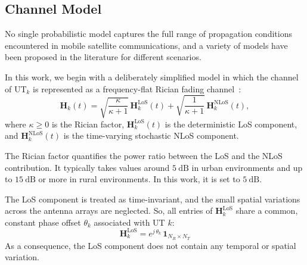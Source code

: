 \subsection*{Channel Model}

No single probabilistic model captures the full range of propagation conditions encountered in mobile satellite communications, and a variety of models have been proposed in the literature for different scenarios.

In this work, we begin with a deliberately simplified model in which the channel of \ac{UT}$_k$ is represented as a frequency-flat Rician fading channel~\cite{4_mimo_over_satellite_review, 7_coherence_time_non_terrestrial}:
\begin{equation}
\label{eq:rician_channel_model}
    \mathbf{H}_k(t) = \sqrt{\frac{\kappa}{\kappa+1}} \, \mathbf{H}_k^{\mathrm{LoS}}(t) + \sqrt{\frac{1}{\kappa+1}} \, \mathbf{H}_k^{\mathrm{NLoS}}(t),
\end{equation}
where $\kappa \geq 0$ is the Rician factor, $\mathbf{H}_k^{\mathrm{LoS}}(t)$ is the deterministic \acf{LoS} component, and $\mathbf{H}_k^{\mathrm{NLoS}}(t)$ is the time-varying stochastic \acf{NLoS} component.

The Rician factor quantifies the power ratio between the \ac{LoS} and the \ac{NLoS} contribution.
It typically takes values around $5~\mathrm{dB}$ in urban environments and up to $15~\mathrm{dB}$ or more in rural environments.
In this work, it is set to $5~\mathrm{dB}$.

The \ac{LoS} component is treated as time-invariant, and the small spatial variations across the antenna arrays are neglected. 
So, all entries of $\mathbf{H}_k^{\mathrm{LoS}}$ share a common, constant phase offset $\theta_k$ associated with \ac{UT} $k$:
\begin{equation}
\label{eq:rician_channel_LoS}
    \mathbf{H}_k^{\mathrm{LoS}} = e^{j\,\theta_k} \, \mathbf{1}_{N_R \times N_T}
\end{equation}
As a consequence, the \ac{LoS} component does not contain any temporal or spatial variation.


